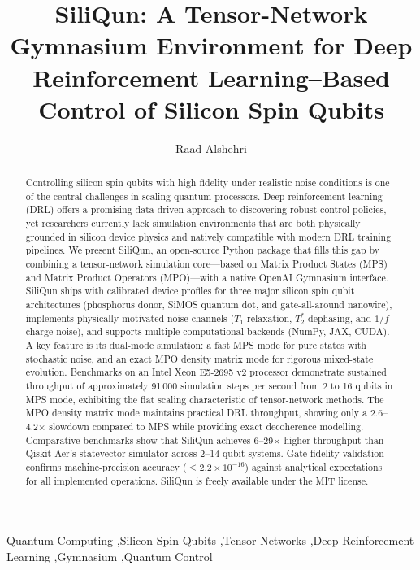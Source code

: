 \documentclass[preprint,12pt, a4paper]{elsarticle}
\begin{document}
\renewcommand{\labelenumii}{\arabic{enumi}.\arabic{enumii}}

\begin{frontmatter}

\title{SiliQun: A Tensor-Network Gymnasium Environment for Deep Reinforcement Learning--Based Control of Silicon Spin Qubits}

\author[label1]{Raad Alshehri}
\address[label1]{Faculty of Computing and Information Technology, King Abdulaziz University, Jeddah 21589, Saudi Arabia}

\begin{abstract}
Controlling silicon spin qubits with high fidelity under realistic noise conditions is one of the central challenges in scaling quantum processors. Deep reinforcement learning (DRL) offers a promising data-driven approach to discovering robust control policies, yet researchers currently lack simulation environments that are both physically grounded in silicon device physics and natively compatible with modern DRL training pipelines. We present SiliQun, an open-source Python package that fills this gap by combining a tensor-network simulation core---based on Matrix Product States (MPS) and Matrix Product Operators (MPO)---with a native OpenAI Gymnasium interface. SiliQun ships with calibrated device profiles for three major silicon spin qubit architectures (phosphorus donor, SiMOS quantum dot, and gate-all-around nanowire), implements physically motivated noise channels ($T_1$ relaxation, $T_2^*$ dephasing, and $1/f$ charge noise), and supports multiple computational backends (NumPy, JAX, CUDA). A key feature is its dual-mode simulation: a fast MPS mode for pure states with stochastic noise, and an exact MPO density matrix mode for rigorous mixed-state evolution. Benchmarks on an Intel Xeon E5-2695 v2 processor demonstrate sustained throughput of approximately 91\,000 simulation steps per second from 2 to 16 qubits in MPS mode, exhibiting the flat scaling characteristic of tensor-network methods. The MPO density matrix mode maintains practical DRL throughput, showing only a 2.6--4.2$\times$ slowdown compared to MPS while providing exact decoherence modelling. Comparative benchmarks show that SiliQun achieves 6--29$\times$ higher throughput than Qiskit Aer's statevector simulator across 2--14 qubit systems. Gate fidelity validation confirms machine-precision accuracy ($\leq 2.2 \times 10^{-16}$) against analytical expectations for all implemented operations. SiliQun is freely available under the MIT license.
\end{abstract}

\begin{keyword}
Quantum Computing \sep Silicon Spin Qubits \sep Tensor Networks \sep Deep Reinforcement Learning \sep Gymnasium \sep Quantum Control
\end{keyword}

\end{frontmatter}
\end{document}
